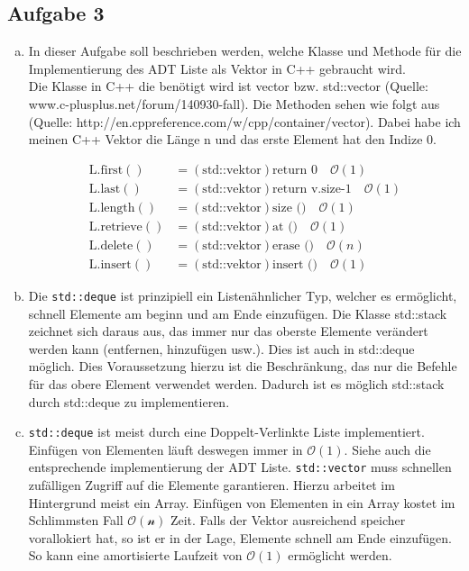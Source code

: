 \documentclass[11pt]{article}
\begin{document}
\subsection*{Aufgabe 3}
\begin{enumerate}[a)]
	\item 
  In dieser Aufgabe soll beschrieben werden, welche Klasse und Methode für die
  Implementierung des ADT Liste als Vektor in C++ gebraucht wird.\\ Die Klasse
  in C++ die benötigt wird ist vector bzw. std::vector (Quelle:
  www.c-plusplus.net/forum/140930-fall). Die Methoden sehen wie folgt aus
  (Quelle: http://en.cppreference.com/w/cpp/container/vector). Dabei habe ich
  meinen C++ Vektor die Länge n und das erste Element hat den Indize 0.

  \begin{align}
    \text{L.first}() &= (\text{std::vektor}) \text{return 0}\quad \mathcal{O}(1)\\
    \text{L.last}() &= (\text{std::vektor}) \text{return v.size-1}\quad \mathcal{O}(1)\\
    \text{L.length}() &= (\text{std::vektor}) \text{size ()}\quad \mathcal{O}(1)\\
    \text{L.retrieve}() &= (\text{std::vektor}) \text{at ()}\quad \mathcal{O}(1)\\
    \text{L.delete}() &= (\text{std::vektor}) \text{erase ()}\quad \mathcal{O}(n)\\
    \text{L.insert}() &= (\text{std::vektor}) \text{insert ()}\quad \mathcal{O}(1)
  \end{align}
	
	\item

  Die \texttt{std::deque} ist prinzipiell ein Listen\"ahnlicher Typ,
  welcher es erm\"oglicht, schnell Elemente am beginn und am 
  Ende einzuf\"ugen.  Die Klasse std::stack zeichnet sich daraus
  aus, das immer nur das oberste Elemente verändert werden kann (entfernen,
  hinzufügen usw.). Dies ist auch in std::deque möglich. Dies Voraussetzung
  hierzu ist die Beschränkung, das nur die Befehle für das obere Element
  verwendet werden. Dadurch ist es möglich std::stack durch std::deque zu
  implementieren. 

	\item
     \texttt{std::deque} ist meist durch eine Doppelt-Verlinkte Liste
     implementiert. Einf\"ugen von Elementen l\"auft deswegen immer
     in $\mathcal{O}(1)$. Siehe auch die entsprechende
     implementierung der ADT Liste. \texttt{std::vector} muss
     schnellen zuf\"alligen Zugriff auf die Elemente garantieren. Hierzu
     arbeitet im Hintergrund meist ein Array. Einf\"ugen von Elementen
     in ein Array kostet im Schlimmsten Fall $\mathcal{O(n)}$ Zeit.
     Falls der Vektor ausreichend speicher vorallokiert hat, so
     ist er in der Lage, Elemente schnell am Ende einzuf\"ugen. So 
     kann eine amortisierte Laufzeit von $\mathcal{O}(1)$ erm\"oglicht werden.

	
\end{enumerate}
\end{document}

